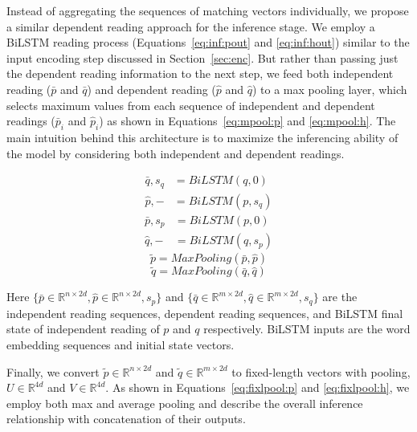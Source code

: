 \documentclass[11pt,a4paper]{article}
\begin{document}
	Instead of aggregating the sequences of matching vectors individually, we propose a similar dependent reading approach for the inference stage. We employ a BiLSTM reading process (Equations~\ref{eq:inf:pout} and \ref{eq:inf:hout}) similar to the input encoding step discussed in Section~\ref{sec:enc}. But rather than passing just the dependent reading information to the next step, we feed both independent reading ($\bar{p}$ and $\bar{q}$) and dependent reading ($\hat{p}$ and $\hat{q}$) to a max pooling layer, which selects maximum values from each sequence of independent and dependent readings ($\bar{p}_i$ and $\hat{p}_i$) as shown in Equations~\ref{eq:mpool:p} and \ref{eq:mpool:h}. The main intuition behind this architecture is to maximize the inferencing ability of the model by considering both independent and dependent readings.
	
	
	\begin{equation}
	\begin{split}
	\bar{q}, s_q &= \textit{BiLSTM}(q, 0) \\
	\hat{p}, - &= \textit{BiLSTM}(p, s_q)
	\end{split}
	\label{eq:inf:pout}
	\end{equation}
	\begin{equation}
	\begin{split}
	\bar{p}, s_p &= \textit{BiLSTM}(p, 0) \\
	\hat{q}, - &= \textit{BiLSTM}(q, s_p)
	\end{split}
	\label{eq:inf:hout}
	\end{equation}
	\begin{equation}
	\tilde{p} = \textit{MaxPooling}(\bar{p}, \hat{p})
	\label{eq:mpool:p}
	\end{equation}
	\begin{equation}
	\tilde{q} = \textit{MaxPooling}(\bar{q}, \hat{q})
	\label{eq:mpool:h}
	\end{equation}
	
	
	\noindent Here $\{\bar{p} \in \mathbb{R}^{n \times 2d}, \hat{p} \in \mathbb{R}^{n \times 2d}, s_p\}$ and $\{\bar{q} \in \mathbb{R}^{m \times 2d}, \hat{q} \in \mathbb{R}^{m \times 2d}, s_q\}$ are the independent reading sequences, dependent reading sequences, and BiLSTM final state of independent reading of $p$ and $q$ respectively. BiLSTM inputs are the word embedding sequences and initial state vectors. 
	
	Finally, we convert $\tilde{p} \in \mathbb{R}^{n\times 2d}$ and $\tilde{q} \in \mathbb{R}^{m \times 2d}$ to fixed-length vectors with pooling, $U \in \mathbb{R}^{4d}$ and $V \in \mathbb{R}^{4d}$. As shown in Equations~\ref{eq:fixlpool:p} and \ref{eq:fixlpool:h}, we employ both max and average pooling and describe the overall inference relationship with concatenation of their outputs.
	
\end{document}

